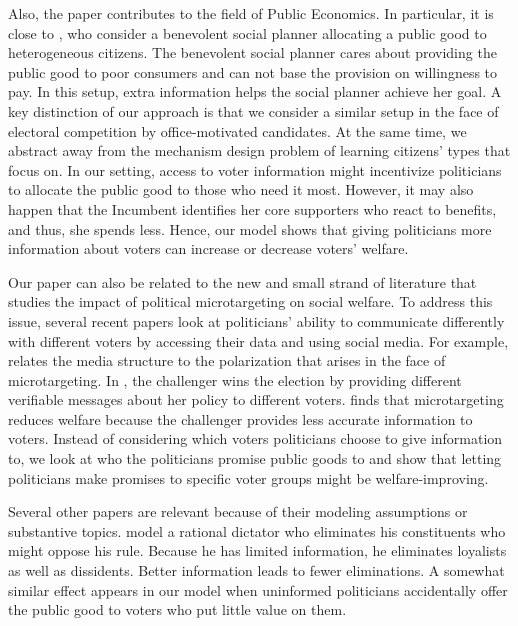 \documentclass[12pt,english]{article}
\begin{document}
Also, the paper contributes to the field of Public Economics. In particular, it is close to \cite{akbarpour2023redistributive}, who consider a benevolent social planner allocating a public good to heterogeneous citizens. The benevolent social planner cares about providing the public good to poor consumers and can not base the provision on willingness to pay. In this setup, extra information helps the social planner achieve her goal. A key distinction of our approach is that we consider a similar setup in the face of electoral competition by office-motivated candidates. At the same time, we abstract away from the mechanism design problem of learning citizens' types that \cite{akbarpour2023redistributive} focus on. In our setting, access to voter information might incentivize politicians to allocate the public good to those who need it most. However, it may also happen that the Incumbent identifies her core supporters who react to benefits, and thus, she spends less. Hence, our model shows that giving politicians more information about voters can increase or decrease voters' welfare. 

Our paper can also be related to the new and small strand of literature that studies the impact of political microtargeting on social welfare. To address this issue, several recent papers look at politicians' ability to communicate differently with different voters by accessing their data and using social media.  For example, \cite{prummer2020micro} relates the media structure to the polarization that arises in the face of microtargeting. In \citet{titova2022targeted}, the challenger wins the election by providing different verifiable messages about her policy to different voters. \citet{titova2022targeted} finds that microtargeting reduces welfare because the challenger provides less accurate information to voters. Instead of considering which voters politicians choose to give information to, we look at who the politicians promise public goods to and show that letting politicians make promises to specific voter groups might be welfare-improving.

Several other papers are relevant because of their modeling assumptions or substantive topics. \cite{gregory2011rational} model a rational dictator who eliminates his constituents who might oppose his rule. Because he has limited information, he eliminates loyalists as well as dissidents. Better information leads to fewer eliminations. A somewhat similar effect appears in our model when uninformed politicians accidentally offer the public good to voters who put little value on them. 
\end{document}

